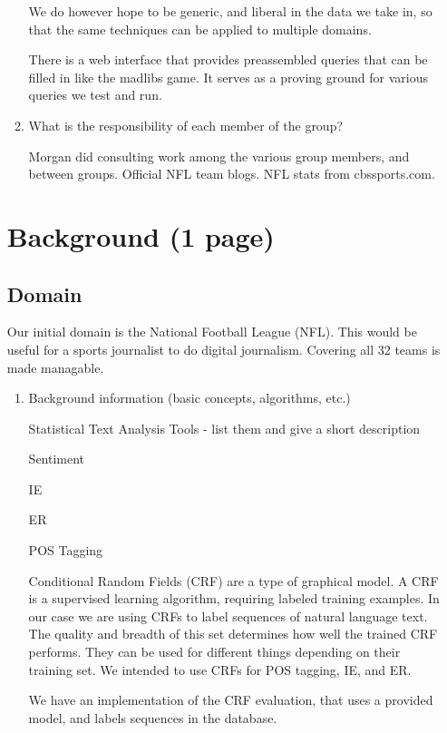 \documentclass{article}
\begin{document}
\begin{enumerate}
\begin{enumerate}
    We do however hope to be generic, and liberal in the data we take in, so that the same techniques can be applied to multiple domains.

    There is a web interface that provides preassembled queries that can be filled in like the madlibs game.
    It serves as a proving ground for various queries we test and run.

  \item What is the responsibility of each member of the group?



    Morgan did consulting work among the various group members, and between groups.
    Official NFL team blogs. NFL stats from cbssports.com.
  \end{enumerate}

  \section{Background (1 page)}
  \subsection{Domain}

  Our initial domain is the National Football League (NFL).
  This would be useful for a sports journalist to do digital journalism.
  Covering all 32 teams is made managable.

  \begin{enumerate}
  \item Background information (basic concepts, algorithms, etc.)


    Statistical Text Analysis Tools - list them and give a short description

    Sentiment

    IE

    ER

    POS Tagging

    Conditional Random Fields (CRF) are a type of graphical model.
    A CRF is a supervised learning algorithm, requiring labeled training examples.
    In our case we are using CRFs to label sequences of natural language text.
    The quality and breadth of this set determines how well the trained CRF performs.
    They can be used for different things depending on their training set.
    We intended to use CRFs for POS tagging, IE, and ER.

    We have an implementation of the CRF evaluation, that uses a provided model, and labels sequences in the database.


\end{enumerate}
\end{enumerate}
\end{document}
